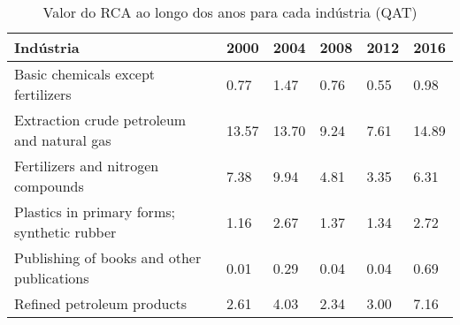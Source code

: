 \begin{table}
\centering
\caption{Valor do RCA ao longo dos anos para cada indústria (QAT)}
\begin{tabular}{p{6cm}p{1.5cm}p{1.5cm}p{1.5cm}p{1.5cm}p{1.5cm}}
\toprule
                                  Indústria &  2000 &  2004 & 2008 & 2012 &  2016 \\
\midrule
         Basic chemicals except fertilizers &  0.77 &  1.47 & 0.76 & 0.55 &  0.98 \\
 Extraction crude petroleum and natural gas & 13.57 & 13.70 & 9.24 & 7.61 & 14.89 \\
         Fertilizers and nitrogen compounds &  7.38 &  9.94 & 4.81 & 3.35 &  6.31 \\
Plastics in primary forms; synthetic rubber &  1.16 &  2.67 & 1.37 & 1.34 &  2.72 \\
 Publishing of books and other publications &  0.01 &  0.29 & 0.04 & 0.04 &  0.69 \\
                 Refined petroleum products &  2.61 &  4.03 & 2.34 & 3.00 &  7.16 \\
\bottomrule
\end{tabular}
\end{table}
